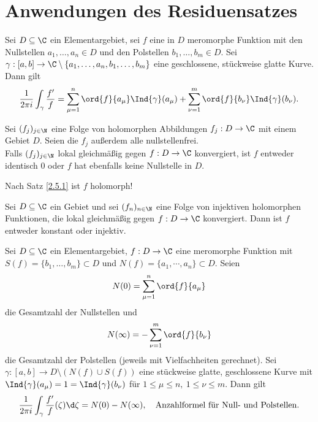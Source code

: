 \section{Anwendungen des Residuensatzes} \lecture
		
		\begin{thm}\label{3.5.1}
			Sei $D \subseteq \C$ ein Elementargebiet, sei $f$ eine in $D$ meromorphe Funktion mit den Nullstellen $ a_1,\dotsc,a_n \in D $ und den Polstellen $ b_1,\dotsc,b_m \in D $. Sei $ \gamma:[a,b] \to \C\setminus\{a_1,\dotsc,a_n,b_1,\dotsc,b_m\} $ eine geschlossene, stückweise glatte Kurve. Dann gilt 
			\[ \frac{1}{2\pi i} \int_\gamma \frac{f'}{f} = \sum_{\mu=1}^n \ord{f}{a_\mu} \Ind{\gamma}(a_\mu) + \sum_{\nu=1}^m \ord{f}{b_\nu} \Ind{\gamma}(b_\nu). \]
		\end{thm}
		
		\begin{thm}[Hurwitz, 1889]
			Sei $ (f_j)_{j \in \N} $ eine Folge von holomorphen Abbildungen $ f_j : D \to \C $ mit einem Gebiet $D$. Seien die $f_j$ außerdem alle nullstellenfrei.\\
			Falls $(f_j)_{j \in \N}$ lokal gleichmäßig gegen $f: D \to \C$ konvergiert, ist $f$ entweder identisch 0 oder $f$ hat ebenfalls keine Nullstelle in $D$.
		\end{thm}
		
		\begin{rem}
			Nach Satz \ref{2.5.1} ist $f$ holomorph!
		\end{rem}
		
		\begin{cor}
			Sei $ D \subseteq \C $ ein Gebiet und sei $ (f_n)_{n \in \N} $ eine Folge von injektiven holomorphen Funktionen, die lokal gleichmäßig gegen $f: D \to \C$ konvergiert. Dann ist $f$ entweder konstant oder injektiv.
		\end{cor}
		
		\begin{cor}\label{3.5.4}
			Sei $ D \subseteq \C $ ein Elementargebiet, $f: D \to \C$ eine meromorphe Funktion mit $ S(f) = \{b_1,\dotsc,b_m\} \subset D $ und $ N(f) = \{a_1,\dotsm,a_n\} \subset D $.	Seien 
			$$ N(0) = \sum_{\mu=1}^n \ord{f}{a_\mu} $$
			 die Gesamtzahl der Nullstellen und 
			 $$ N(\infty) = -\sum_{\nu=1}^m \ord{f}{b_\nu} $$
			 die Gesamtzahl der Polstellen (jeweils mit Vielfachheiten gerechnet). Sei $ \gamma: [a,b] \to D\setminus(N(f) \cup S(f)) $ eine stückweise glatte, geschlossene Kurve mit $ \Ind{\gamma}(a_\mu) = 1 = \Ind{\gamma}(b_\nu) $ für $ 1 \leq \mu \leq n,\ 1 \leq \nu \leq  m$. Dann gilt
			\[ \frac{1}{2\pi i} \int_\gamma \frac{f'}{f}(\zeta) \d\zeta = N(0) - N(\infty), \quad \text{Anzahlformel für Null- und Polstellen.} \]
		\end{cor}
		
